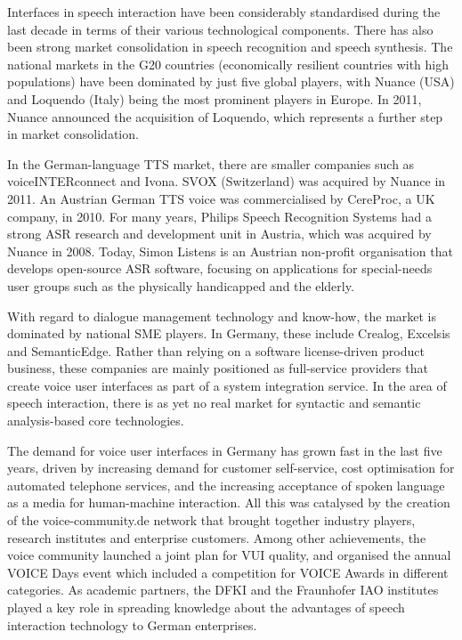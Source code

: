 \documentclass[]{../../metanetpaper}
\begin{document}
\begin{multicols}{2}
Interfaces in speech interaction have been considerably standardised during the last decade in terms of their various technological components. There has also been strong market consolidation in speech recognition and speech synthesis. The national markets in the G20 countries (economically resilient countries with high populations) have been dominated by just five global players, with Nuance (USA) and Loquendo (Italy) being the most prominent players in Europe. In 2011, Nuance announced the acquisition of Loquendo, which represents a further step in market consolidation.

In the German-language TTS market, there are smaller companies such as voiceINTERconnect and Ivona. SVOX (Switzerland) was acquired by Nuance in 2011. An Austrian German TTS voice was commercialised by CereProc, a UK company, in 2010. For many years, Philips Speech Recognition Systems had a strong ASR research and development unit in Austria, which was acquired by Nuance in 2008. Today, Simon Listens is an Austrian non-profit organisation that develops open-source ASR software, focusing on applications for special-needs user groups such as the physically handicapped and the elderly.

With regard to dialogue management technology and know-how, the market is dominated by national SME players. In Germany, these include Crealog, Excelsis and SemanticEdge. Rather than relying on a software license-driven product business, these companies are mainly positioned as full-service providers that create voice user interfaces as part of a system integration service. In the area of speech interaction, there is as yet no real market for syntactic and semantic analysis-based core technologies.

The demand for voice user interfaces in Germany has grown fast in the last five years, driven by increasing demand for customer self-service, cost optimisation for automated telephone services, and the increasing acceptance of spoken language as a media for human-machine interaction. All this was catalysed by the creation of the voice-community.de network that brought together industry players, research institutes and enterprise customers. Among other achievements, the voice community launched a joint plan for VUI quality, and organised the annual VOICE Days event which included a competition for VOICE Awards in different categories. As academic partners, the DFKI and the Fraunhofer IAO institutes played a key role in spreading knowledge about the advantages of speech interaction technology to German enterprises.


\end{multicols}
\end{document}
